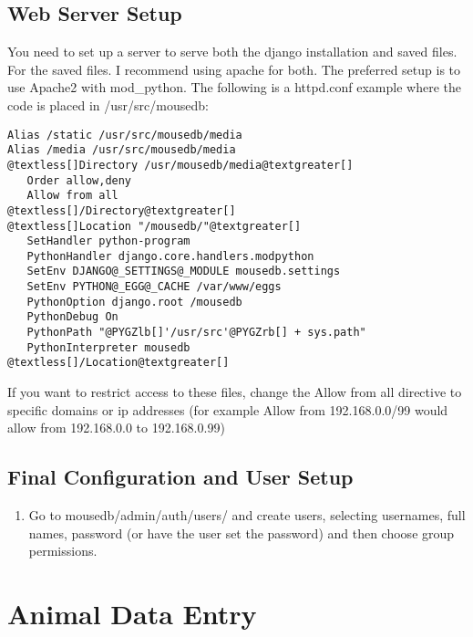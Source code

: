 \documentclass[letterpaper,10pt,english]{sphinxmanual}
\begin{document}
\section{Web Server Setup}

You need to set up a server to serve both the django installation and saved files.  For the saved files.  I recommend using apache for both.  The preferred setup is to use Apache2 with mod\_python.  The following is a httpd.conf example where the code is placed in /usr/src/mousedb:

\begin{Verbatim}[commandchars=@\[\]]
Alias /static /usr/src/mousedb/media
Alias /media /usr/src/mousedb/media
@textless[]Directory /usr/mousedb/media@textgreater[]
   Order allow,deny
   Allow from all
@textless[]/Directory@textgreater[]
@textless[]Location "/mousedb/"@textgreater[]
   SetHandler python-program
   PythonHandler django.core.handlers.modpython
   SetEnv DJANGO@_SETTINGS@_MODULE mousedb.settings
   SetEnv PYTHON@_EGG@_CACHE /var/www/eggs
   PythonOption django.root /mousedb
   PythonDebug On
   PythonPath "@PYGZlb[]'/usr/src'@PYGZrb[] + sys.path"
   PythonInterpreter mousedb
@textless[]/Location@textgreater[]
\end{Verbatim}

If you want to restrict access to these files, change the Allow from all directive to specific domains or ip addresses (for example Allow from 192.168.0.0/99 would allow from 192.168.0.0 to 192.168.0.99)


\section{Final Configuration and User Setup}
\begin{enumerate}
\item {} 
Go to mousedb/admin/auth/users/ and create users, selecting usernames, full names, password (or have the user set the password) and then choose group permissions.

\end{enumerate}

\resetcurrentobjects
\hypertarget{--doc-usage}{}

\chapter{Animal Data Entry}
\end{document}
